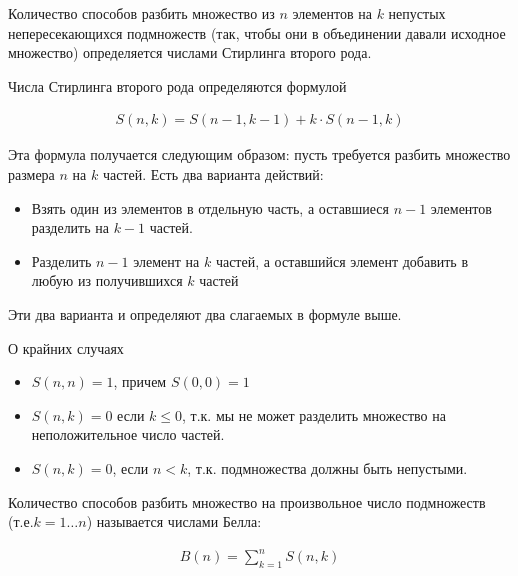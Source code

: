 
\begin{definition}
  Количество способов разбить множество из \(n\) элементов на \(k\) непустых
  непересекающихся подмножеств (так, чтобы они в объединении давали исходное
  множество) определяется числами Стирлинга второго рода.
\end{definition}

\begin{definition}
  Числа Стирлинга второго рода определяются формулой

  \begin{align*}
    S(n, k) = S(n - 1, k - 1) + k \cdot S(n - 1, k)
  \end{align*}
\end{definition}

Эта формула получается следующим образом: пусть требуется разбить множество
размера \(n\) на \(k\) частей. Есть два варианта действий:
\begin{itemize}
  \item Взять один из элементов в отдельную часть, а оставшиеся \(n - 1\)
  элементов разделить на \(k - 1\) частей.

  \item Разделить \(n - 1\) элемент на \(k\) частей, а оставшийся элемент
  добавить в любую из получившихся \(k\) частей
\end{itemize}
Эти два варианта и определяют два слагаемых в формуле выше.

\begin{remark}
  О крайних случаях

  \begin{itemize}
    \item \(S(n, n) = 1\), причем \(S(0, 0) = 1\)
    
    \item \(S(n, k) = 0\) если \(k \le 0\), т.к. мы не может разделить множество
    на неположительное число частей.

    \item \(S(n, k) = 0\), если \(n < k\), т.к. подмножества должны быть
    непустыми.
  \end{itemize}
\end{remark}

\begin{remark}
  Количество способов разбить множество на произвольное число подмножеств
  (т.е.\(k = 1 \dotsc n\)) называется числами Белла:

  \begin{align*}
    B(n) = \sum_{k = 1}^{n} S(n, k)
  \end{align*}
\end{remark}
